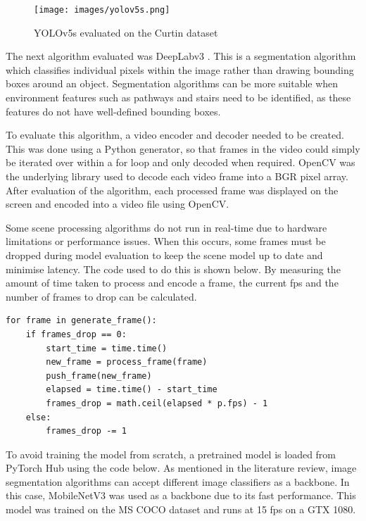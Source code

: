 \begin{figure}[H]
    \centering
    \texttt{[image: images/yolov5s.png]}
    \caption{YOLOv5s evaluated on the Curtin dataset}
    \label{fig:yolov5s}
\end{figure}

The next algorithm evaluated was DeepLabv3 \cite{chenRethinkingAtrousConvolution2017}. This is a segmentation algorithm
which classifies individual pixels within the image rather than drawing bounding boxes around an object.
Segmentation algorithms can be more suitable when environment features such as pathways and stairs need to be identified,
as these features do not have well-defined bounding boxes.

To evaluate this algorithm, a video encoder and decoder needed to be created. This was done using a Python generator,
so that frames in the video could simply be iterated over within a for loop and only decoded when required.
OpenCV \cite{bradskiOpenCVLibrary2000} was the underlying library used to decode each video frame into a BGR pixel array.
After evaluation of the algorithm, each processed frame was displayed on the screen and encoded into a video file using OpenCV.

Some scene processing algorithms do not run in real-time due to hardware limitations or performance issues.
When this occurs, some frames must be dropped during model evaluation to keep the scene model up to date and minimise latency.
The code used to do this is shown below. By measuring the amount of time taken to process and encode a frame, the current fps
and the number of frames to drop can be calculated.

\begin{verbatim}
for frame in generate_frame():
    if frames_drop == 0:
        start_time = time.time()
        new_frame = process_frame(frame)
        push_frame(new_frame)
        elapsed = time.time() - start_time
        frames_drop = math.ceil(elapsed * p.fps) - 1
    else:
        frames_drop -= 1
\end{verbatim}

To avoid training the model from scratch, a pretrained model is loaded from PyTorch Hub using the code below.
As mentioned in the literature review, image segmentation algorithms can accept different image classifiers as a backbone.
In this case, MobileNetV3 \cite{howardSearchingMobileNetV32019} was used as a backbone due to its fast performance.
This model was trained on the MS COCO \cite{linMicrosoftCOCOCommon2014} dataset and runs at 15 fps on a GTX 1080.

